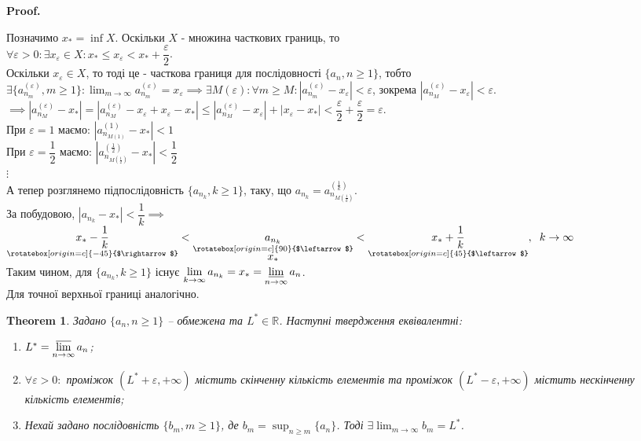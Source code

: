 \documentclass[a4paper, 14pt]{article}
\makeatletter
\def\qed{$\blacksquare$}
\theoremstyle{theoremdd}
\newtheorem{theorem}{Theorem}[subsection]
\theoremstyle{theoremdd}
\theoremstyle{theoremdd}
\theoremstyle{theoremdd}
\theoremstyle{theoremdd}
\theoremstyle{theoremdd}
\theoremstyle{theoremdd}
\theoremstyle{theoremdd}
\renewenvironment{proof}[1][Proof.\\]{\par
\pushQED{\hfill \qed}%
\normalfont \topsep6\p@\@plus6\p@\relax
\trivlist
\item\relax
{\bfseries
#1\@addpunct{.}}\hspace\labelsep\ignorespaces
}{%
\popQED\endtrivlist\@endpefalse
}
\makeatother
\begin{document}
	\begin{proof}
	Позначимо $x_* = \inf X$. Оскільки $X$ - множина часткових границь, то\\
	$\forall \varepsilon > 0: \exists x_{\varepsilon} \in X: x_* \leq x_{\varepsilon} < x_* + \dfrac{\varepsilon}{2}$.\\
	Оскільки $x_\varepsilon \in X$, то тоді це - часткова границя для послідовності $\{a_n, n \geq 1\}$, тобто \\ $\exists \{a_{n_m}^{(\varepsilon)}, m \geq 1\}: \displaystyle \lim_{m \to \infty} a_{n_m}^{(\varepsilon)} = x_{\varepsilon} \implies \exists M(\varepsilon): \forall m \geq M: |a_{n_m}^{(\varepsilon)} - x_{\varepsilon}| < \varepsilon$, зокрема $|a_{n_M}^{(\varepsilon)} - x_\varepsilon| < \varepsilon$.\\
	$\implies |a_{n_M}^{(\varepsilon)} - x_*| = |a_{n_M}^{(\varepsilon)} - x_{\varepsilon} + x_{\varepsilon} - x_*| \leq |a_{n_M}^{(\varepsilon)} - x_{\varepsilon}| + |x_{\varepsilon} - x_*| < \dfrac{\varepsilon}{2} + \dfrac{\varepsilon}{2} = \varepsilon$.\\
	При $\varepsilon = 1$ маємо: $|a_{n_{M(1)}}^{(1)} - x_*| < 1$\\
	При $\varepsilon = \dfrac{1}{2}$ маємо: $|a_{n_{M(\frac{1}{2})}}^{(\frac{1}{2})} - x_*| < \dfrac{1}{2}$\\
	$\vdots$\\
	А тепер розглянемо підпослідовність $\{a_{n_k}, k \geq 1\}$, таку, що $a_{n_k} = a_{n_{M(\frac{1}{k})}}^{(\frac{1}{k})}$.\\
	За побудовою, $|a_{n_k} - x_*| < \dfrac{1}{k} \implies$ $\displaystyle \underset{\rotatebox[origin=c]{-45}{$\rightarrow$}}{x_*-\frac{1}{k}} < \underset{\underset{\displaystyle x_*}{\rotatebox[origin=c]{90}{$\leftarrow$}}}{a_{n_k}} < \underset{\rotatebox[origin=c]{45}{$\leftarrow$}}{x_*+\frac{1}{k}}, \hspace{0.2cm} k \to \infty$\\
	Таким чином, для $\{a_{n_k}, k \geq 1\}$ існує $\displaystyle \lim_{k \to \infty} a_{n_k} = x_* = \varliminf_{n \to \infty} a_n$.
	\bigskip \\
	Для точної верхньої границі аналогічно.
	\end{proof}
	
	\begin{theorem}
	Задано $\{a_n, n \geq 1\}$ -- обмежена та $L^* \in \mathbb{R}$. Наступні твердження еквівалентні:
	\begin{enumerate}[nosep,wide=0pt,label={\arabic*)}]
	\item $L^* = \displaystyle \varlimsup_{n \to \infty} a_n$;
	\item $\forall \varepsilon > 0:$ проміжок $(L^*+\varepsilon, + \infty)$ містить скінченну кількість елементів та проміжок $(L^*-\varepsilon, + \infty)$ містить нескінченну кількість елементів;
	\item Нехай задано послідовність $\{b_m, m \geq 1\}$, де $b_m = \displaystyle \sup_{n \geq m} \{a_n\}$. Тоді $\exists \displaystyle \lim_{m \to \infty} b_m = L^*$.
	\end{enumerate}
	\end{theorem}
	
\end{document}
